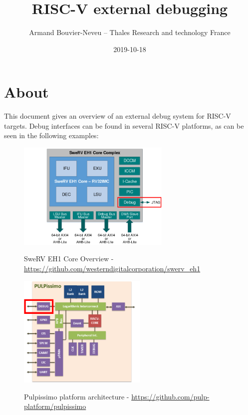 \documentclass{article}
\title{RISC-V external debugging}
\date{2019-10-18}
\author{Armand Bouvier-Neveu -- Thales Research and technology France}
\begin{document}
	\maketitle
	
	\section{About}
	
	This document gives an overview of an external debug system for RISC-V targets. Debug interfaces can be found in several RISC-V platforms, as can be seen in the following examples:
	
	\begin{figure}[H]
   	\centering
   	\includegraphics[width=0.65\textwidth]{swerv.png}
   	
   	SweRV EH1 Core Overview - \url{https://github.com/westerndigitalcorporation/swerv_eh1}
	\end{figure}
	
	\begin{figure}[H]
   	\centering
   	\includegraphics[width=0.55\textwidth]{pulpissimo.png}
   	
   	Pulpissimo platform architecture - \url{https://github.com/pulp-platform/pulpissimo}
	\end{figure}
	
\end{document}
